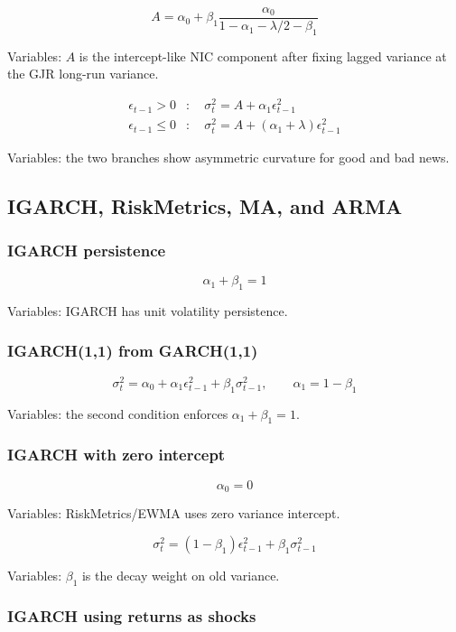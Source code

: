 \documentclass[
  8pt,
  twocolumn]{extarticle}
\begin{document}
\[
A=\alpha_0+\beta_1\frac{\alpha_0}{1-\alpha_1-\lambda/2-\beta_1}
\]

Variables: \(A\) is the intercept-like NIC component after fixing lagged
variance at the GJR long-run variance.

\[
\begin{aligned}
\epsilon_{t-1}>0&:\quad \sigma_t^2=A+\alpha_1\epsilon_{t-1}^2\\
\epsilon_{t-1}\le0&:\quad \sigma_t^2=A+(\alpha_1+\lambda)\epsilon_{t-1}^2
\end{aligned}
\]

Variables: the two branches show asymmetric curvature for good and bad
news.

\subsection{IGARCH, RiskMetrics, MA, and
ARMA}\label{igarch-riskmetrics-ma-and-arma}

\subsubsection{IGARCH persistence}\label{igarch-persistence}

\[
\alpha_1+\beta_1=1
\]

Variables: IGARCH has unit volatility persistence.

\subsubsection{IGARCH(1,1) from GARCH(1,1)}\label{igarch11-from-garch11}

\[
\sigma_t^2=\alpha_0+\alpha_1\epsilon_{t-1}^2+\beta_1\sigma_{t-1}^2,\qquad \alpha_1=1-\beta_1
\]

Variables: the second condition enforces \(\alpha_1+\beta_1=1\).

\subsubsection{IGARCH with zero
intercept}\label{igarch-with-zero-intercept}

\[
\alpha_0=0
\]

Variables: RiskMetrics/EWMA uses zero variance intercept.

\[
\sigma_t^2=(1-\beta_1)\epsilon_{t-1}^2+\beta_1\sigma_{t-1}^2
\]

Variables: \(\beta_1\) is the decay weight on old variance.

\subsubsection{IGARCH using returns as
shocks}\label{igarch-using-returns-as-shocks}
\end{document}
